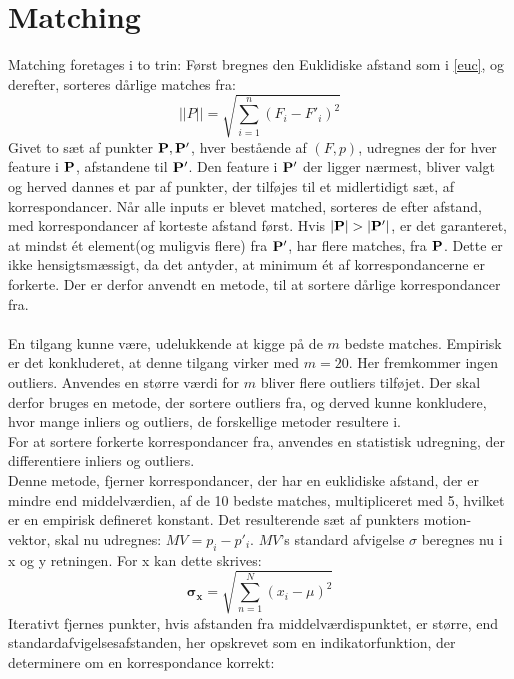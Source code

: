 \section{Matching}
Matching foretages i to trin: Først bregnes den Euklidiske afstand som i \eqref{euc}, og derefter, sorteres dårlige matches fra: 
\begin{equation}
||P|| = \sqrt{\sum\limits_{i=1}^n(F_i-F'_i)^2}
\label{euc}
\end{equation}
Givet to sæt af punkter $\bold{P}, \bold{P}'$, hver bestående af $(F, p)$, udregnes der for hver feature i $\bold{P}$, afstandene til $\bold{P}'$. Den feature i $\bold{P}'$ der ligger nærmest, bliver valgt og herved dannes et par af punkter, der tilføjes til et midlertidigt sæt, af korrespondancer. Når alle inputs er blevet matched, sorteres de efter afstand, med korrespondancer af korteste afstand først. Hvis $|\bold{P}| > |\bold{P}'|$, er det garanteret, at mindst ét element(og muligvis flere) fra $\bold{P}'$, har flere matches, fra $\bold{P}$. Dette er ikke hensigtsmæssigt, da det antyder, at minimum ét af korrespondancerne er forkerte. Der er derfor anvendt en metode, til at sortere dårlige korrespondancer fra.
\\
\\
En tilgang kunne være, udelukkende at kigge på de $m$ bedste matches. Empirisk er det konkluderet, at denne tilgang virker med $m=20$. Her fremkommer ingen outliers. Anvendes en større værdi for $m$ bliver flere outliers tilføjet. Der skal derfor bruges en metode, der sortere outliers fra, og derved kunne konkludere, hvor mange inliers og outliers, de forskellige metoder resultere i.
\\
For at sortere forkerte korrespondancer fra, anvendes en statistisk udregning, der differentiere inliers og outliers.
\\
Denne metode, fjerner korrespondancer, der har en euklidiske afstand, der er mindre end middelværdien, af de 10 bedste matches, multipliceret med 5, hvilket er en empirisk defineret konstant. Det resulterende sæt af punkters motion-vektor, skal nu udregnes: $MV = p_i - p'_i$. 
$MV$'s standard afvigelse $\sigma$ beregnes nu i x og y retningen. For x kan dette skrives: 
\begin{equation}
\boldsymbol{\sigma_x} = \sqrt{ \sum \limits_{n=1}^N (x_i  - \mu)^2 }
\label{pis}
\end{equation}
Iterativt fjernes punkter, hvis afstanden fra middelværdispunktet, er større, end standardafvigelsesafstanden, her opskrevet som en indikatorfunktion, der determinere om en korrespondance korrekt:

